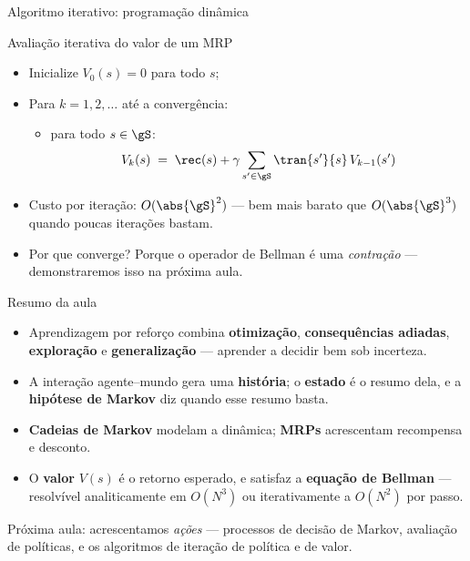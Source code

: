 \documentclass[aspectratio=169, 11pt]{beamer}
\begin{document}
\begin{frame}{Algoritmo iterativo: programação dinâmica}
  \begin{algbox}{Avaliação iterativa do valor de um MRP}
    \begin{itemize}
      \item Inicialize $V_0(s) = 0$ para todo $s$;
      \item Para $k = 1, 2, \ldots$ até a convergência:
        \begin{itemize}
          \item para todo $s \in \gS$:
            \[
              V_k(s) \;=\; \rec(s)
                + \gamma \sum_{s' \in \gS} \tran{s'}{s}\, V_{k-1}(s')
            \]
        \end{itemize}
    \end{itemize}
  \end{algbox}

  \begin{itemize}
    \item Custo por iteração: $O(\abs{\gS}^2)$ — bem mais barato que
          $O(\abs{\gS}^3)$ quando poucas iterações bastam.
    \item Por que converge? Porque o operador de Bellman é uma
          \emph{contração} — demonstraremos isso na próxima aula.
  \end{itemize}
\end{frame}

\begin{frame}{Resumo da aula}
  \begin{itemize}
    \item Aprendizagem por reforço combina \textbf{otimização},
          \textbf{consequências adiadas}, \textbf{exploração} e
          \textbf{generalização} — aprender a decidir bem sob incerteza.
    \item A interação agente–mundo gera uma \textbf{história}; o
          \textbf{estado} é o resumo dela, e a \textbf{hipótese de Markov}
          diz quando esse resumo basta.
    \item \textbf{Cadeias de Markov} modelam a dinâmica;
          \textbf{MRPs} acrescentam recompensa e desconto.
    \item O \textbf{valor} $V(s)$ é o retorno esperado, e satisfaz a
          \textbf{equação de Bellman} — resolvível analiticamente em
          $O(N^3)$ ou iterativamente a $O(N^2)$ por passo.
  \end{itemize}

  \begin{ideiabox}
    Próxima aula: acrescentamos \emph{ações} — processos de decisão de
    Markov, avaliação de políticas, e os algoritmos de iteração de política
    e de valor.
  \end{ideiabox}
\end{frame}
\end{document}
